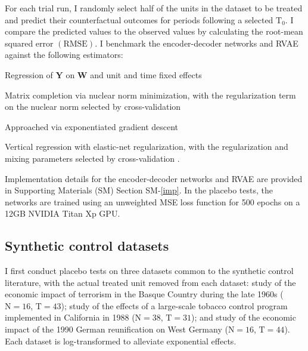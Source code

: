 For each trial run, I randomly select half of the units in the dataset to be treated and predict their counterfactual outcomes for periods following a selected $\text{T}_0$. I compare the predicted values to the observed values by calculating the root-mean squared error $(\text{RMSE})$. I benchmark the encoder-decoder networks and RVAE against the following estimators: 
%
\begin{description}
		{\setlength\itemindent{1mm}
			\item[(a) DID] Regression of $\textbf{Y}$ on $\textbf{W}$ and unit and time fixed effects
			\item[(b) MC-NNM] Matrix completion via nuclear norm minimization, with the regularization term on the nuclear norm selected by cross-validation \citep{athey2017matrix}
			\item[(c) SCM] Approached via exponentiated gradient descent \citep{abadie2010synthetic}
			\item[(d) VT-EN] Vertical regression with elastic-net regularization, with the regularization and mixing parameters selected by cross-validation \citep{zou2005regularization,athey2017matrix}.
		}
\end{description}

Implementation details for the encoder-decoder networks and RVAE are provided in Supporting Materials (SM) Section SM-\ref{imp}. In the placebo tests, the networks are trained using an unweighted MSE loss function for 500 epochs on a 12GB NVIDIA Titan Xp GPU.

\subsection{Synthetic control datasets} \label{synth-placebo}

I first conduct placebo tests on three datasets common to the synthetic control literature, with the actual treated unit removed from each dataset:  study of the economic impact of terrorism in the Basque Country during the late 1960s ($\text{N}=16$, $\text{T}=43$);  study of the effects of a large-scale tobacco control program implemented in California in 1988 ($\text{N}=38$, $\text{T}=31$); and  study of the economic impact of the 1990 German reunification on West Germany ($\text{N}=16$, $\text{T}=44$). Each dataset is log-transformed to alleviate exponential effects.

